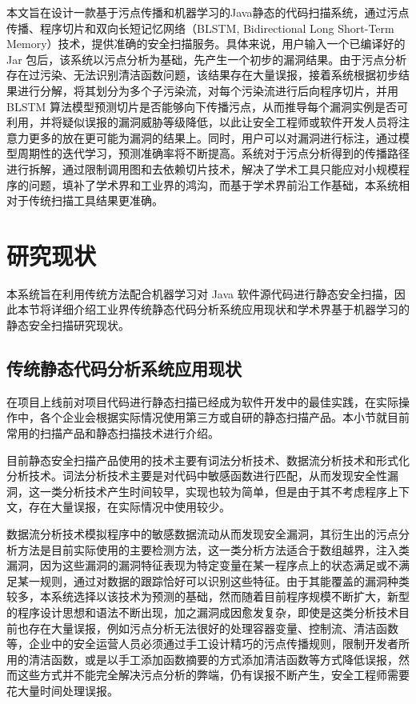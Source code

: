 本文旨在设计一款基于污点传播和机器学习的Java静态的代码扫描系统，通过污点传播、程序切片和双向长短记忆网络（BLSTM, Bidirectional Long Short-Term Memory）技术，提供准确的安全扫描服务。具体来说，用户输入一个已编译好的 Jar 包后，该系统以污点分析为基础，先产生一个初步的漏洞结果。由于污点分析存在过污染、无法识别清洁函数问题，该结果存在大量误报，接着系统根据初步结果进行分解，将其划分为多个子污染流，对每个污染流进行后向程序切片，并用 BLSTM 算法模型预测切片是否能够向下传播污点，从而推导每个漏洞实例是否可利用，并将疑似误报的漏洞威胁等级降低，以此让安全工程师或软件开发人员将注意力更多的放在更可能为漏洞的结果上。同时，用户可以对漏洞进行标注，通过模型周期性的迭代学习，预测准确率将不断提高。系统对于污点分析得到的传播路径进行拆解，通过限制调用图和去依赖切片技术，解决了学术工具只能应对小规模程序的问题，填补了学术界和工业界的鸿沟，而基于学术界前沿工作基础，本系统相对于传统扫描工具结果更准确。

\section{研究现状}
本系统旨在利用传统方法配合机器学习对 Java 软件源代码进行静态安全扫描，因此本节将详细介绍工业界传统静态代码分析系统应用现状和学术界基于机器学习的静态安全扫描研究现状。\\

\subsection{传统静态代码分析系统应用现状}

在项目上线前对项目代码进行静态扫描已经成为软件开发中的最佳实践，在实际操作中，各个企业会根据实际情况使用第三方或自研的静态扫描产品。本小节就目前常用的扫描产品和静态扫描技术进行介绍。

目前静态安全扫描产品使用的技术主要有词法分析技术、数据流分析技术和形式化分析技术。词法分析技术主要是对代码中敏感函数进行匹配，从而发现安全性漏洞，这一类分析技术产生时间较早，实现也较为简单，但是由于其不考虑程序上下文，存在大量误报，在实际情况中使用较少。

数据流分析技术模拟程序中的敏感数据流动从而发现安全漏洞，其衍生出的污点分析方法是目前实际使用的主要检测方法，这一类分析方法适合于数组越界，注入类漏洞，因为这些漏洞的漏洞特征表现为特定变量在某一程序点上的状态满足或不满足某一规则，通过对数据的跟踪恰好可以识别这些特征。由于其能覆盖的漏洞种类较多，本系统选择以该技术为预测的基础，然而随着目前程序规模不断扩大，新型的程序设计思想和语法不断出现，加之漏洞成因愈发复杂，即使是这类分析技术目前也存在大量误报，例如污点分析无法很好的处理容器变量、控制流、清洁函数等，企业中的安全运营人员必须通过手工设计精巧的污点传播规则，限制开发者所用的清洁函数，或是以手工添加函数摘要的方式添加清洁函数等方式降低误报，然而这些方式并不能完全解决污点分析的弊端，仍有误报不断产生，安全工程师需要花大量时间处理误报。
   
